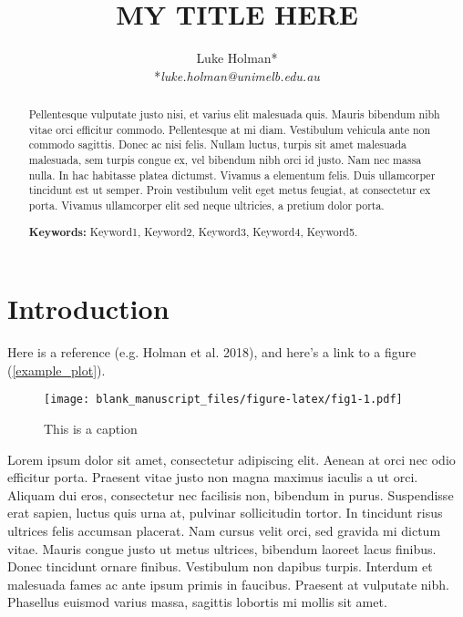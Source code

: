 \documentclass[12pt,]{article}
\title{MY TITLE HERE}
\author{Luke Holman* \\ *\textit{luke.holman@unimelb.edu.au} \vspace{5mm}}
\date{}
\begin{document}
\maketitle
\begin{abstract}
Pellentesque vulputate justo nisi, et varius elit malesuada quis. Mauris
bibendum nibh vitae orci efficitur commodo. Pellentesque at mi diam.
Vestibulum vehicula ante non commodo sagittis. Donec ac nisi felis.
Nullam luctus, turpis sit amet malesuada malesuada, sem turpis congue
ex, vel bibendum nibh orci id justo. Nam nec massa nulla. In hac
habitasse platea dictumst. Vivamus a elementum felis. Duis ullamcorper
tincidunt est ut semper. Proin vestibulum velit eget metus feugiat, at
consectetur ex porta. Vivamus ullamcorper elit sed neque ultricies, a
pretium dolor porta. \vspace{5mm}

\par

\noindent\textbf{Keywords:} Keyword1, Keyword2, Keyword3, Keyword4,
Keyword5.
\end{abstract}

\maketitle{}

\newpage

\hypertarget{introduction}{%
\section{Introduction}\label{introduction}}

Here is a reference (e.g. Holman et al. 2018), and here's a link to a
figure (\autoref{example_plot}).

\begin{figure}
\centering
\texttt{[image: blank\_manuscript\_files/figure-latex/fig1-1.pdf]}
\caption{\label{example_plot}This is a caption}
\end{figure}

Lorem ipsum dolor sit amet, consectetur adipiscing elit. Aenean at orci
nec odio efficitur porta. Praesent vitae justo non magna maximus iaculis
a ut orci. Aliquam dui eros, consectetur nec facilisis non, bibendum in
purus. Suspendisse erat sapien, luctus quis urna at, pulvinar
sollicitudin tortor. In tincidunt risus ultrices felis accumsan
placerat. Nam cursus velit orci, sed gravida mi dictum vitae. Mauris
congue justo ut metus ultrices, bibendum laoreet lacus finibus. Donec
tincidunt ornare finibus. Vestibulum non dapibus turpis. Interdum et
malesuada fames ac ante ipsum primis in faucibus. Praesent at vulputate
nibh. Phasellus euismod varius massa, sagittis lobortis mi mollis sit
amet.
\end{document}
